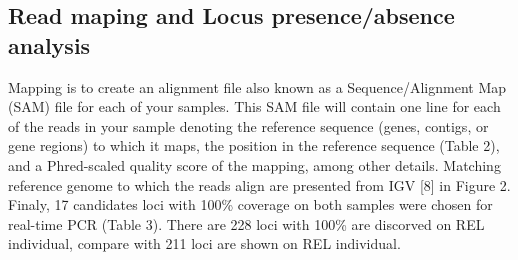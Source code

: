 \documentclass[conference]{IEEEtran}
\begin{document}
\subsection{Read maping and Locus presence/absence analysis}
Mapping is to create an alignment file also known as a Sequence/Alignment Map (SAM) file for each of your samples. This SAM file will contain one line for each of the reads in your sample denoting the reference sequence (genes, contigs, or gene regions) to which it maps, the position in the reference sequence (Table 2), and a Phred-scaled quality score of the mapping, among other details. Matching reference genome to which the reads align are presented from IGV [8] in Figure 2. Finaly, 17 candidates loci with 100\% coverage on both samples were chosen for real-time PCR (Table 3). There are 228 loci with 100\% are discorved on REL individual, compare with 211 loci are shown on REL individual.
\end{document}
